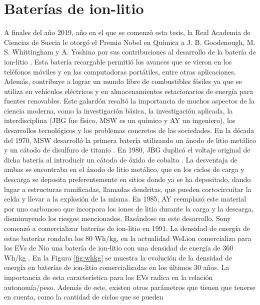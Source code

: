 \section{Baterías de ion-litio}

A finales del año 2019, año en el que se comenzó esta tesis, la Real Academia 
de Ciencias de Suecia le otorgó el Premio Nobel en Química a J. B. Goodenough, 
M. S. Whittingham y A. Yoshino por sus contribuciones al desarrollo de la batería 
de ion-litio \cite{nobel}. Esta batería recargable permitió los avances que se vieron en los 
teléfonos móviles y en las computadoras portátiles, entre otras aplicaciones.
Además, contribuye a lograr un mundo libre de combustibles fósiles ya que se utiliza en 
vehículos eléctricos y en almacenamientos estacionarios de energía para fuentes
renovables. Este galardón resaltó la importancia de muchos aspectos de la ciencia
moderna, como la investigación básica, la investigación aplicada, la 
interdisciplina (JBG fue físico, MSW es un químico y AY un ingeniero), los 
desarrollos tecnológicos y los problemas concretos de las sociedades.
En la década del 1970, MSW desarrolló la primera batería utilizando un ánodo de
litio metálico y un cátodo de disulfuro de titanio \cite{whittingham1976}. En 
1980, JBG duplicó el voltaje original de dicha batería al introducir un cátodo 
de óxido de cobalto \cite{mizushima1980}.
La desventaja de ambas se encontraba en el ánodo de litio metálico, que en los 
ciclos de carga y descarga se deposita preferentemente en sitios donde ya se 
ha depositado, dando lugar a estructuras ramificadas, llamadas dendritas, que 
pueden cortocircuitar la celda y llevar a la explosión de la misma. En 1985,
AY reemplazó este material por uno carbonoso que incorpora los iones de litio
durante la carga y la descarga, disminuyendo los riesgos mencionados. Basándose
en este desarrollo, Sony comenzó a comercializar baterías de ion-litio en 1991.
La densidad de energía de estas baterías rondaba los 80 Wh/kg, en la actualidad
WeLion comercializa para los EVs de Nio una batería de ion-litio con una 
densidad de energía de 360 Wh/kg \cite{li2023700}. En la Figura \ref{fig:whkg} se muestra la 
evolución de la densidad de energía en baterías de ion-litio comercializadas 
en los últimos 30 años. La importancia de esta característica para los EVs 
radica en la relación autonomía/peso. Además de este, existen otros parámetros 
que tienen que tenerse en cuenta, como la cantidad de ciclos que se pueden 
